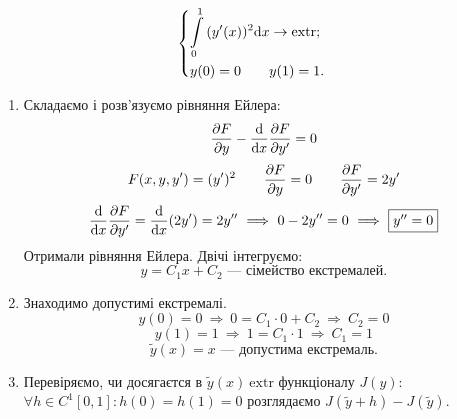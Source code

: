 \begin{example}
 $$
 \begin{dcases}
   \int\limits_{0}^{ 1}{(y'(x))^2 \mathrm{d} x} \to \mathrm{extr};\\
   y(0) = 0 \qquad y(1) = 1.
 \end{dcases}
 $$
 \begin{enumerate}
   \item Складаємо і розв'язуємо рівняння Ейлера:
   $$
   \frac{\partial F}{\partial y} - \frac{\mathrm{d} }{ \mathrm{d} x} \frac{\partial F}{\partial y'} = 0
   $$
   $$
   F(x,y,y') = (y')^2 \qquad \frac{\partial F}{\partial y} = 0 \qquad \frac{\partial F}{\partial y'} = 2y'
   $$
   $$
   \frac{\mathrm{d}}{\mathrm{d} x} \frac{\partial F}{ \partial y'} = \frac{\mathrm{d}}{\mathrm{d} x} (2 y') = 2 y''  \ \Longrightarrow \
   0 - 2y'' = 0 \ \Longrightarrow \  \fbox{$y'' = 0$}
   $$
   Отримали рівняння Ейлера. Двічі інтегруємо:
   $$
   y = C_1 x + C_2 \text{ --- сімейство екстремалей.}
   $$
   \item Знаходимо допустимі екстремалі.
   $$
   y(0) = 0 \ \Rightarrow \  0 = C_1 \cdot 0 + C_2 \ \Rightarrow \  C_2 = 0
   $$
   $$
   y(1) = 1 \ \Rightarrow \  1 = C_1 \cdot 1 \ \Rightarrow \  C_1 = 1
   $$
   $$
   \tilde{y}(x) = x \text{ --- допустима екстремаль.}
   $$
   \item Перевіряємо, чи досягаєтся в $\tilde{y} (x)\  \mathrm{extr}$ функціоналу $J(y)$:\\
   $
   \forall h \in C^1 [0,1] : h(0) = h(1) = 0
   $ розглядаємо $J(\tilde{y} + h) - J(\tilde{y})$.\\
 \end{enumerate}

 \newpage


\end{example}
